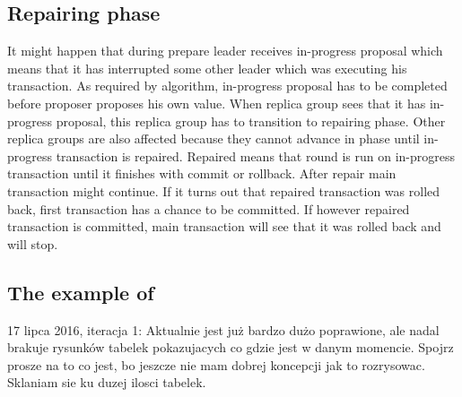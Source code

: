 \subsection{Repairing phase}
It might happen that during prepare leader receives in-progress proposal which means that it has interrupted some other leader which was executing his transaction. As required by \paxos algorithm, in-progress proposal has to be completed before proposer proposes his own value. When replica group sees that it has in-progress proposal, this replica group has to transition to repairing phase. 
Other replica groups are also affected because they cannot advance in phase until in-progress transaction is repaired. Repaired means that \mpt round is run on in-progress transaction until it finishes with commit or rollback. 
After repair main transaction might continue. If it turns out that repaired transaction was rolled back, first transaction has a chance to be committed. If however repaired transaction is committed, main transaction will see that it was rolled back and will stop.




\subsection{The example of \mpt}
17 lipca 2016, iteracja 1: Aktualnie jest już bardzo dużo poprawione, ale nadal brakuje rysunków tabelek pokazujacych co gdzie jest w danym momencie. Spojrz prosze na to co jest, bo jeszcze nie mam dobrej koncepcji jak to rozrysowac. Sklaniam sie ku duzej ilosci tabelek.

